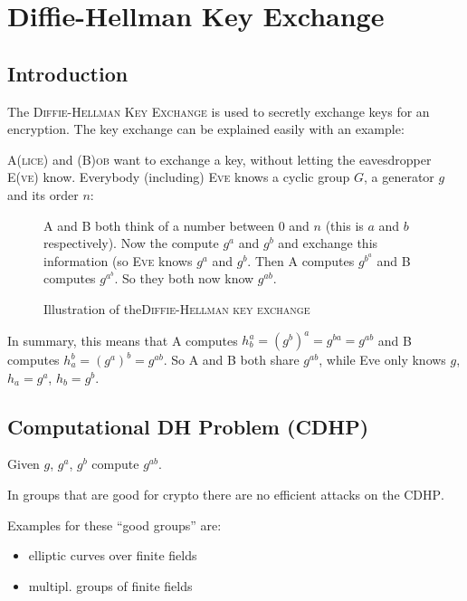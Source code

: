 \chapter{Diffie-Hellman Key Exchange}

\section{Introduction}

The \textsc{Diffie-Hellman Key Exchange} is used to secretly exchange keys for an encryption. The key exchange can be explained easily with an example:

\textsc{A(lice)} and \textsc{(B)ob} want to exchange a key, without letting the eavesdropper \textsc{E(ve)} know. Everybody (including) \textsc{Eve} knows a cyclic group $G$, a generator $g$ and its order $n$:

\begin{figure}[H]
  \caption{Illustration of the\textsc{Diffie-Hellman key exchange}}{\textsc{A} and \textsc{B} both think of a number between $0$ and $n$ (this is $a$ and $b$ respectively). Now the compute $g^a$ and $g^b$ and exchange this information (so \textsc{Eve} knows $g^a$ and $g^b$. Then \textsc{A} computes $g^{b^a}$ and \textsc{B} computes $g^{a^b}$. So they both now know $g^{ab}$.}
  \label{fig:caesar_cipher}
\end{figure}

In summary, this means that \textsc{A} computes $h_b^a = (g^b)^a = g^{ba} = g^{ab}$ and \textsc{B} computes $h_a^b = (g^a)^b = g^{ab}$. So \textsc{A} and \textsc{B} both share $g^{ab}$, while Eve only knows $g$, $h_a = g^a$, $h_b =g^b$.

\section{Computational DH Problem (CDHP)}

Given $g$, $g^a$, $g^b$ compute $g^{ab}$.

In groups that are good for crypto there are no efficient attacks on the \textsc{CDHP}.

\begin{example} Examples for these ``good groups'' are:
\begin{itemize}
\item elliptic curves over finite fields
\item multipl. groups of finite fields
\end{itemize}
\end{example}

